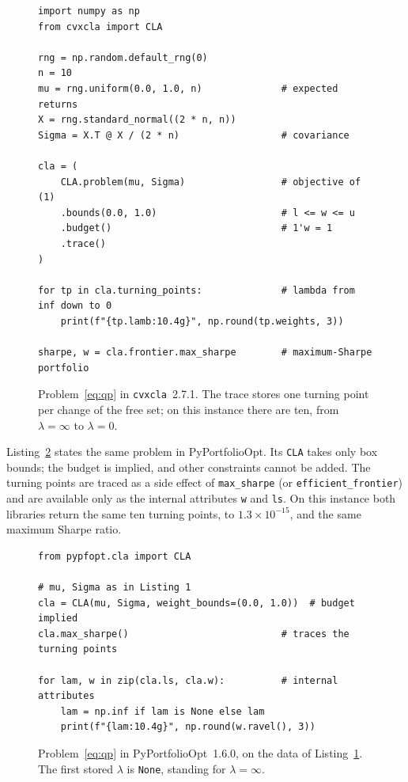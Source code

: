 \documentclass[11pt,a4paper]{article}
\newcommand{\code}[1]{\texttt{#1}}
\newcommand{\cvxcla}{\code{cvxcla}}
\begin{document}
\begin{figure}[ht]
\begin{lstlisting}[style=py]
import numpy as np
from cvxcla import CLA

rng = np.random.default_rng(0)
n = 10
mu = rng.uniform(0.0, 1.0, n)              # expected returns
X = rng.standard_normal((2 * n, n))
Sigma = X.T @ X / (2 * n)                  # covariance

cla = (
    CLA.problem(mu, Sigma)                 # objective of (1)
    .bounds(0.0, 1.0)                      # l <= w <= u
    .budget()                              # 1'w = 1
    .trace()
)

for tp in cla.turning_points:              # lambda from inf down to 0
    print(f"{tp.lamb:10.4g}", np.round(tp.weights, 3))

sharpe, w = cla.frontier.max_sharpe        # maximum-Sharpe portfolio
\end{lstlisting}
\caption{Problem~\eqref{eq:qp} in \cvxcla{}~2.7.1. The trace stores one
  turning point per change of the free set; on this instance there are ten,
  from $\lambda = \infty$ to $\lambda = 0$.}\label{lst:cvxcla}
\end{figure}

Listing~\ref{lst:pypfopt} states the same problem in PyPortfolioOpt. Its
\code{CLA} takes only box bounds; the budget is implied, and other constraints
cannot be added. The turning points are traced as a side effect of
\code{max\_sharpe} (or \code{efficient\_frontier}) and are available only as
the internal attributes \code{w} and \code{ls}. On this instance both
libraries return the same ten turning points, to $1.3 \times 10^{-15}$, and
the same maximum Sharpe ratio.

\begin{figure}[ht]
\begin{lstlisting}[style=py]
from pypfopt.cla import CLA

# mu, Sigma as in Listing 1
cla = CLA(mu, Sigma, weight_bounds=(0.0, 1.0))  # budget implied
cla.max_sharpe()                           # traces the turning points

for lam, w in zip(cla.ls, cla.w):          # internal attributes
    lam = np.inf if lam is None else lam
    print(f"{lam:10.4g}", np.round(w.ravel(), 3))
\end{lstlisting}
\caption{Problem~\eqref{eq:qp} in PyPortfolioOpt~1.6.0, on the data of
  Listing~\ref{lst:cvxcla}. The first stored $\lambda$ is \code{None},
  standing for $\lambda = \infty$.}\label{lst:pypfopt}
\end{figure}
\end{document}
